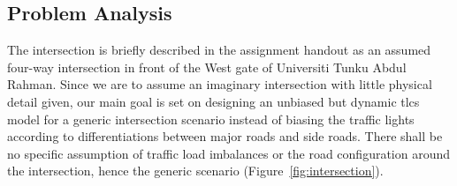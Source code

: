\subsection{Problem Analysis}
The intersection is briefly described in the assignment handout as an assumed four-way intersection in front of the West gate of Universiti Tunku Abdul Rahman. Since we are to assume an imaginary intersection with little physical detail given, our main goal is set on designing an unbiased but dynamic \ac{tlcs} model for a generic intersection scenario instead of biasing the traffic lights according to differentiations between major roads and side roads. There shall be no specific assumption of traffic load imbalances or the road configuration around the intersection, hence the generic scenario (Figure~\ref{fig:intersection}).
